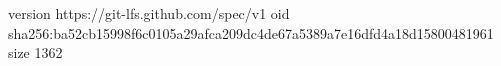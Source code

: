 version https://git-lfs.github.com/spec/v1
oid sha256:ba52cb15998f6c0105a29afca209dc4de67a5389a7e16dfd4a18d15800481961
size 1362
